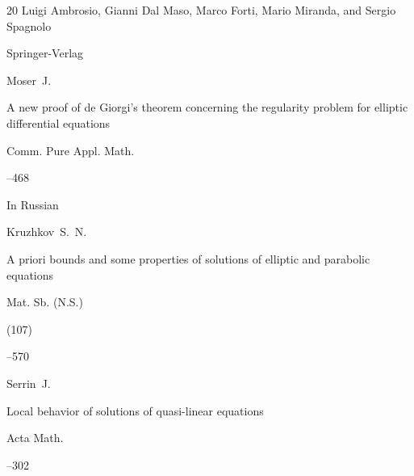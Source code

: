 \begin{thebibliography}{20}
\eds Luigi Ambrosio, Gianni Dal Maso, Marco Forti, Mario Miranda, and Sergio Spagnolo

\publ Springer-Verlag








\by  Moser~J.

\paper A new proof of de Giorgi's theorem concerning the regularity problem for elliptic differential equations

\jour Comm. Pure Appl. Math.




--468







\lang In Russian

\by Kruzhkov~S.~N.

\paper A priori bounds and some properties of solutions of elliptic and parabolic equations

\jour Mat. Sb. (N.S.)


(107)


--570










\by  Serrin~J.

\paper Local behavior of solutions of quasi-linear equations

\jour Acta Math.




--302








\end{thebibliography}
